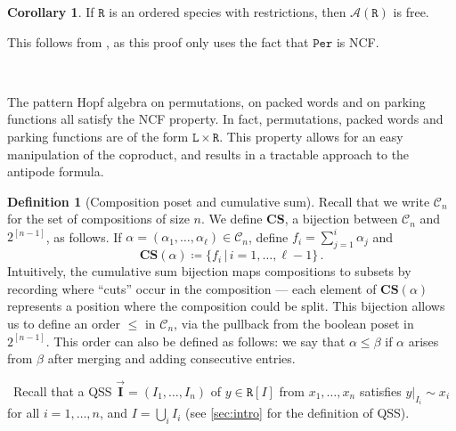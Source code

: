 \documentclass[12pt, reqno]{amsart}
\theoremstyle{definition}
\newtheorem{cor}[thm]{Corollary}
\newtheorem{defin}[thm]{Definition}
\newcommand{\III}{\vec{\mathbf{I}}}
\begin{document}
\begin{cor}\label{cor:freeNCF}
If $\mathtt{R}$ is an ordered species with restrictions, then $\mathcal A(\mathtt{R})$ is free.
\end{cor}
This follows from \cite[Theorem 5.2]{Vargas}, as this proof only uses the fact that $\mathtt{Per}$ is NCF.

\

The pattern Hopf algebra on permutations, on packed words and on parking functions all satisfy the NCF property.
In fact, permutations, packed words and parking functions are of the form $\mathtt{L} \times \mathtt{R}$.
This property allows for an easy manipulation of the coproduct, and results in a tractable approach to the antipode formula.

\begin{defin}[Composition poset and cumulative sum]
Recall that we write $\mathcal C_n$ for the set of compositions of size $n$.
We define $\mathbf{CS}$, a bijection between $\mathcal C_n $ and $2^{[n-1]}$, as follows.
If $\alpha =(\alpha_1, \dots, \alpha_{\ell} ) \in \mathcal C_n$, define $f_i = \sum_{j=1}^i \alpha_j$ and
\begin{equation}
    \mathbf{CS}(\alpha) \coloneqq \{f_i\, | \, i = 1, \dots, \ell - 1\} \, .
\end{equation}
Intuitively, the cumulative sum bijection maps compositions to subsets by recording where ``cuts'' occur in the composition — each element of $\mathbf{CS}(\alpha)$ represents a position where the composition could be split.
This bijection allows us to define an order $\leq $ in $\mathcal C_n$, via the pullback from the boolean poset in $2^{[n-1]}$.
This order can also be defined as follows: we say that $\alpha \leq \beta$ if $\alpha$ arises from $\beta $ after merging and adding consecutive entries.
\end{defin}

\
Recall that a QSS $\III = (I_1, \dots , I_n)$ of $y\in \mathtt{R}[I]$ from $x_1, \dots, x_n$ satisfies $y|_{I_i} \sim x_i$ for all $i = 1, \dots , n$, and $I = \bigcup_i I_i$ (see \cref{sec:intro} for the definition of QSS).
\end{document}
